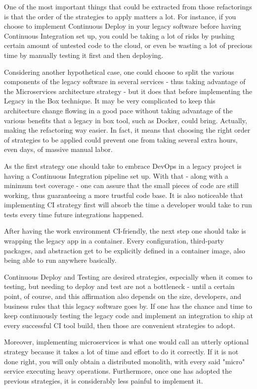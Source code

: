 One of the most important things that could be extracted from those refactorings
is that the order of the strategies to apply matters a lot. For instance, if you
choose to implement Continuous Deploy in your legacy software before having
Continuous Integration set up, you could be taking a lot of risks by pushing
certain amount of untested code to the cloud, or even be wasting a lot of
precious time by manually testing it first and then deploying.

Considering another hypothetical case, one could choose to split the various
components of the legacy software in several services - thus taking advantage of
the Microservices architecture strategy - but it does that before implementing
the Legacy in the Box technique. It may be very complicated to keep this
architecture change flowing in a good pace without taking advantage of the
various benefits that a legacy in box tool, such as Docker, could bring.
Actually, making the refactoring way easier. In fact, it means that choosing the
right order of strategies to be applied could prevent one from taking several
extra hours, even days, of massive manual labor. 

As the first strategy one should take to embrace DevOps in a legacy project is
having a Continuous Integration pipeline set up. With that - along with a
minimum test coverage - one can assure that the small pieces of code are still
working, thus guaranteeing a more trustful code base. It is also noticeable that
implementing CI strategy first will absorb the time a developer would take to
run tests every time future integrations happened. 

After having the work environment CI-friendly, the next step one should take is
wrapping the legacy app in a container. Every configuration, third-party
packages, and abstraction get to be explicitly defined in a container image,
also being able to run anywhere basically.

Continuous Deploy and Testing are desired strategies, especially when it comes
to testing, but needing to deploy and test are not a bottleneck - until a
certain point, of course, and this affirmation also depends on the size,
developers, and business rules that this legacy software goes by. If one has the
chance and time to keep continuously testing the legacy code and implement an
integration to ship at every successful CI tool build, then those are convenient
strategies to adopt.

Moreover, implementing microservices is what one would call an utterly optional
strategy because it takes a lot of time and effort to do it correctly. If it is
not done right, you will only obtain a distributed monolith, with every said
"micro" service executing heavy operations. Furthermore, once one has adopted
the previous strategies, it is considerably less painful to implement it.

